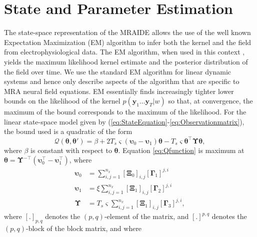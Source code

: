 \documentclass[journal]{IEEEtran}
\begin{document}
\section{State and Parameter Estimation}
The state-space representation of the MRAIDE allows the use of the well known Expectation Maximization (EM) algorithm \cite{Dempster1977} to infer both the kernel and the field from electrophysiological data. The EM algorithm, when used in this context \cite{Dewar2009}, yields the maximum likelihood kernel estimate and the posterior distribution of the field over time. We use the standard EM algorithm for linear dynamic systems \cite{Roweis1999,Shumway2000} and hence only describe aspects of the algorithm that are specific to MRA neural field equations. EM essentially finds increasingly tighter lower bounds on the likelihood of the kernel $p(\mathbf{y}_1 \ldots \mathbf{y}_T|w)$ so that, at convergence, the maximum of the bound corresponds to the maximum of the likelihood. For the linear state-space model given by (\ref{eq:StateEquation}-\ref{eq:Observationmatrix}), the bound used is a quadratic of the form
\begin{equation}\label{eq:Qfunction}
 \mathcal Q\left(\boldsymbol \theta,\boldsymbol\theta'\right)=\beta+2T_s\varsigma\left(\boldsymbol\upsilon_0-\boldsymbol\upsilon_1\right)\boldsymbol\theta-T_s\varsigma\boldsymbol\theta^\top\boldsymbol\Upsilon\boldsymbol\theta,
\end{equation}
where $\beta$ is constant with respect to $\boldsymbol\theta$. Equation \eqref{eq:Qfunction} is maximum at $\boldsymbol \theta= \boldsymbol\Upsilon^{-\top}(\boldsymbol\upsilon_0^\top-\boldsymbol\upsilon_1^\top)$, where
\begin{align}\label{eq:upsilon0}
 \boldsymbol\upsilon_0 & =\sum_{i,j=1}^{n_x}[\boldsymbol\Xi_0]_{i,j}[\boldsymbol\Gamma_1]^{j,i} \\ 
 \boldsymbol\upsilon_1 & =\xi\sum_{i,j=1}^{n_x}[\boldsymbol\Xi_1]_{i,j}[\boldsymbol\Gamma_2]^{j,i} \label{eq:upsilon1}\\
 \boldsymbol\Upsilon&=T_s\varsigma\sum_{i,j=1}^{n_x}[\boldsymbol\Xi_1]_{i,j}[\boldsymbol\Gamma_3]^{j,i},\label{eq:Upsilon}
\end{align}
where $[.]_{p,q}$ denotes the $\left(p,q\right)$-element of the matrix, and $ [.]^{p,q}$ denotes the $\left(p,q\right)$-block of the block matrix, and where
\end{document}

